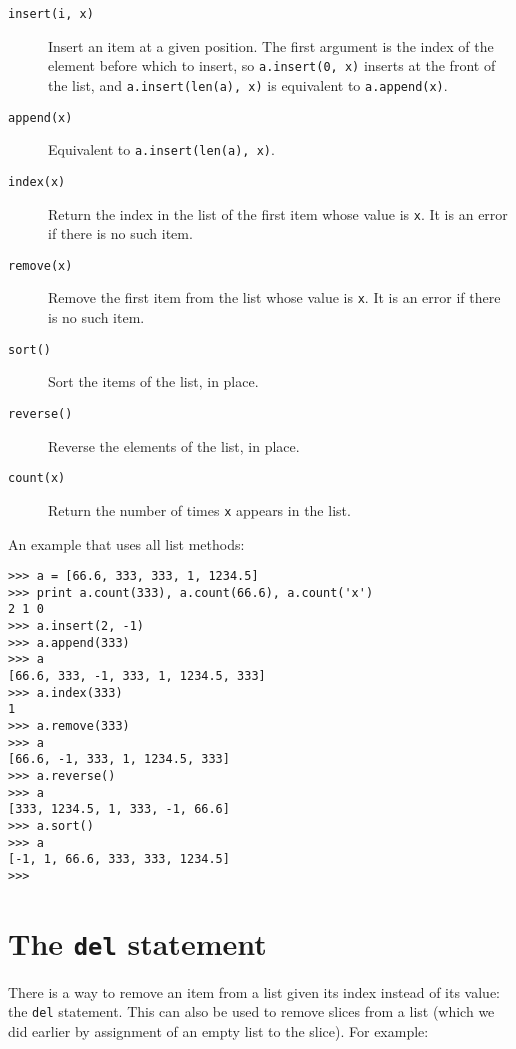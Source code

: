 \begin{description}

\item[{\tt insert(i, x)}]
Insert an item at a given position.  The first argument is the index of
the element before which to insert, so {\tt a.insert(0, x)} inserts at
the front of the list, and {\tt a.insert(len(a), x)} is equivalent to
{\tt a.append(x)}.

\item[{\tt append(x)}]
Equivalent to {\tt a.insert(len(a), x)}.

\item[{\tt index(x)}]
Return the index in the list of the first item whose value is {\tt x}.
It is an error if there is no such item.

\item[{\tt remove(x)}]
Remove the first item from the list whose value is {\tt x}.
It is an error if there is no such item.

\item[{\tt sort()}]
Sort the items of the list, in place.

\item[{\tt reverse()}]
Reverse the elements of the list, in place.

\item[{\tt count(x)}]
Return the number of times {\tt x} appears in the list.

\end{description}

An example that uses all list methods:

\bcode\begin{verbatim}
>>> a = [66.6, 333, 333, 1, 1234.5]
>>> print a.count(333), a.count(66.6), a.count('x')
2 1 0
>>> a.insert(2, -1)
>>> a.append(333)
>>> a
[66.6, 333, -1, 333, 1, 1234.5, 333]
>>> a.index(333)
1
>>> a.remove(333)
>>> a
[66.6, -1, 333, 1, 1234.5, 333]
>>> a.reverse()
>>> a
[333, 1234.5, 1, 333, -1, 66.6]
>>> a.sort()
>>> a
[-1, 1, 66.6, 333, 333, 1234.5]
>>>
\end{verbatim}\ecode

\section{The {\tt del} statement}

There is a way to remove an item from a list given its index instead
of its value: the {\tt del} statement.  This can also be used to
remove slices from a list (which we did earlier by assignment of an
empty list to the slice).  For example:

